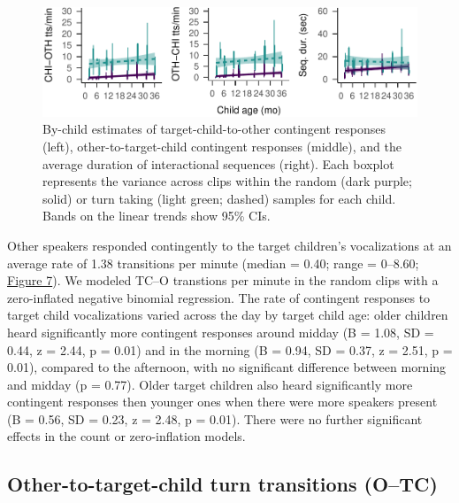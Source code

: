 \documentclass[floatsintext,man]{apa6}
\theoremstyle{definition}
\theoremstyle{definition}
\theoremstyle{definition}
\theoremstyle{remark}
\begin{document}
\begin{figure}
\centering
\includegraphics{Tseltal-CLE_files/figure-latex/fig7-1.pdf}
\caption{\label{fig:fig7}By-child estimates of target-child-to-other
contingent responses (left), other-to-target-child contingent responses
(middle), and the average duration of interactional sequences (right).
Each boxplot represents the variance across clips within the random
(dark purple; solid) or turn taking (light green; dashed) samples for
each child. Bands on the linear trends show 95\% CIs.}
\end{figure}

Other speakers responded contingently to the target children's
vocalizations at an average rate of 1.38 transitions per minute (median
= 0.40; range = 0--8.60; \protect\hyperlink{fig7}{Figure 7}). We modeled
TC--O transtions per minute in the random clips with a zero-inflated
negative binomial regression. The rate of contingent responses to target
child vocalizations varied across the day by target child age: older
children heard significantly more contingent responses around midday (B
= 1.08, SD = 0.44, z = 2.44, p = 0.01) and in the morning (B = 0.94, SD
= 0.37, z = 2.51, p = 0.01), compared to the afternoon, with no
significant difference between morning and midday (p = 0.77). Older
target children also heard significantly more contingent responses then
younger ones when there were more speakers present (B = 0.56, SD = 0.23,
z = 2.48, p = 0.01). There were no further significant effects in the
count or zero-inflation models.

\subsection{Other-to-target-child turn transitions
(O--TC)}\label{other-to-target-child-turn-transitions-otc}
\end{document}
